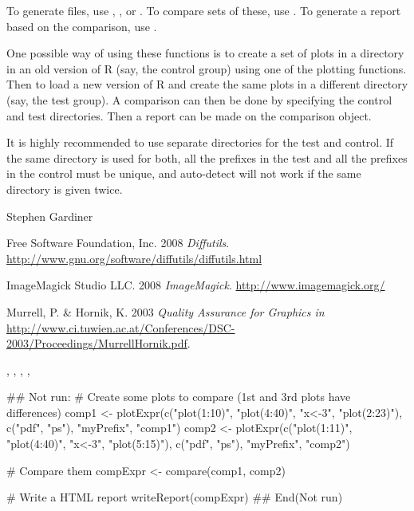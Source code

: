 \documentclass[a4paper,oneside]{book}
\begin{document}
\begin{Details}%
{}
To generate files, use ,
, or .
To compare sets of these, use .
To generate a report based on the comparison, use
.

One possible way of using these functions is to create a set of plots in
a directory in an old version of R (say, the control group) using one
of the plotting functions. Then to load a new version of R and create
the same plots in a different directory (say, the test group). A
comparison can then be done by specifying the control and test
directories. Then a report can be made on the comparison object.

It is highly recommended to use separate directories for the test and
control. If the same directory is used for both, all the prefixes in
the test and all the prefixes in the control must be unique, and
auto-detect will not work if the same directory is given twice.
\end{Details}
\begin{Author}\relax
Stephen Gardiner
\end{Author}
\begin{References}\relax
Free Software Foundation, Inc. 2008 \emph{Diffutils}.
\url{http://www.gnu.org/software/diffutils/diffutils.html}

ImageMagick Studio LLC. 2008 \emph{ImageMagick}.
\url{http://www.imagemagick.org/}

Murrell, P. \& Hornik, K. 2003 \emph{Quality Assurance for Graphics in \R}
\url{http://www.ci.tuwien.ac.at/Conferences/DSC-2003/Proceedings/MurrellHornik.pdf}.
\end{References}
\begin{SeeAlso}\relax
{}, ,
, ,
\end{SeeAlso}
\begin{Examples}
\begin{ExampleCode}
## Not run: 
  # Create some plots to compare (1st and 3rd plots have differences)
  comp1 <- plotExpr(c("plot(1:10)", "plot(4:40)", "x<-3", "plot(2:23)"),
                    c("pdf", "ps"), "myPrefix", "comp1")
  comp2 <- plotExpr(c("plot(1:11)", "plot(4:40)", "x<-3", "plot(5:15)"),
                    c("pdf", "ps"), "myPrefix", "comp2")

  # Compare them
  compExpr <- compare(comp1, comp2)

  # Write a HTML report
  writeReport(compExpr)
## End(Not run)
\end{ExampleCode}
\end{Examples}
\end{document}
